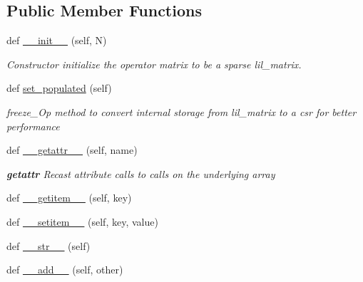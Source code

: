 \subsection*{Public Member Functions}
\begin{DoxyCompactItemize}
\item 
def \hyperlink{classMain__PDE__Repo_1_1src_1_1operatormatrix_1_1OperatorMatrix_a15495a68ab1363574aa90ce186112902}{\+\_\+\+\_\+init\+\_\+\+\_\+} (self, N)
\begin{DoxyCompactList}\small\item\em Constructor initialize the operator matrix to be a sparse lil\+\_\+matrix. \end{DoxyCompactList}\item 
def \hyperlink{classMain__PDE__Repo_1_1src_1_1operatormatrix_1_1OperatorMatrix_a119a9a5351c0e396d6dcc77df1ec1cd9}{set\+\_\+populated} (self)
\begin{DoxyCompactList}\small\item\em freeze\+\_\+\+Op method to convert internal storage from lil\+\_\+matrix to a csr for better performance \end{DoxyCompactList}\item 
def \hyperlink{classMain__PDE__Repo_1_1src_1_1operatormatrix_1_1OperatorMatrix_ac0a77d7612e956bee24bdfb07c9b9d13}{\+\_\+\+\_\+getattr\+\_\+\+\_\+} (self, name)
\begin{DoxyCompactList}\small\item\em {\bfseries getattr} Recast attribute calls to calls on the underlying array \end{DoxyCompactList}\item 
def \hyperlink{classMain__PDE__Repo_1_1src_1_1operatormatrix_1_1OperatorMatrix_a1ee9ad94eeb37416c8841c2284ca3a61}{\+\_\+\+\_\+getitem\+\_\+\+\_\+} (self, key)
\item 
def \hyperlink{classMain__PDE__Repo_1_1src_1_1operatormatrix_1_1OperatorMatrix_a10173d65be38d9160d64550d0ff2dfb5}{\+\_\+\+\_\+setitem\+\_\+\+\_\+} (self, key, value)
\item 
def \hyperlink{classMain__PDE__Repo_1_1src_1_1operatormatrix_1_1OperatorMatrix_a81a5bec4032a3c9b195ea1420572a16c}{\+\_\+\+\_\+str\+\_\+\+\_\+} (self)
\item 
def \hyperlink{classMain__PDE__Repo_1_1src_1_1operatormatrix_1_1OperatorMatrix_a2a877f82af8ca1d41d15dcb0a9edc302}{\+\_\+\+\_\+add\+\_\+\+\_\+} (self, other)
\end{DoxyCompactItemize}
